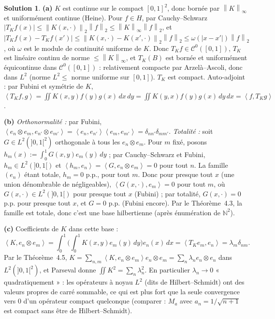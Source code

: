 \documentclass[11pt,a4paper]{article}
\newcommand{\N}{\mathbb{N}}
\newcommand{\norm}[1]{\left\|#1\right\|}
\newcommand{\ps}[2]{\left\langle #1,#2\right\rangle}
\newcommand{\Cz}{\mathcal{C}^0}
\theoremstyle{definition}
\newtheorem*{solution}{Solution}
\begin{document}
\begin{solution}
\noindent\textbf{(a)} $K$ est continue sur le compact $[0,1]^2$, donc bornée par $\norm K_\infty$ et uniformément continue (Heine). Pour $f\in H$, par Cauchy--Schwarz $|T_Kf(x)|\le\norm{K(x,\cdot)}_2\norm f_2\le\norm K_\infty\norm f_2$, et $|T_Kf(x)-T_Kf(x')|\le\norm{K(x,\cdot)-K(x',\cdot)}_2\norm f_2\le\omega(|x-x'|)\norm f_2$, où $\omega$ est le module de continuité uniforme de $K$. Donc $T_Kf\in\Cz([0,1])$, $T_K$ est linéaire continu de norme $\le\norm K_\infty$, et $T_K(B)$ est bornée et uniformément équicontinue dans $\Cz([0,1])$ : relativement compacte par Arzelà--Ascoli, donc dans $L^2$ (norme $L^2\le$ norme uniforme sur $[0,1]$). $T_K$ est compact. Auto-adjoint : par Fubini et symétrie de $K$, $\ps{T_Kf}g=\iint K(x,y)f(y)g(x)\,dx\,dy=\iint K(y,x)f(y)g(x)\,dy\,dx=\ps f{T_Kg}$.

\medskip
\noindent\textbf{(b)} \emph{Orthonormalité :} par Fubini, $\ps{e_n\otimes e_m}{e_{n'}\otimes e_{m'}}=\ps{e_n}{e_{n'}}\ps{e_m}{e_{m'}}=\delta_{nn'}\delta_{mm'}$. \emph{Totalité :} soit $G\in L^2(]0,1[^2)$ orthogonale à tous les $e_n\otimes e_m$. Pour $m$ fixé, posons $h_m(x):=\int_0^1G(x,y)e_m(y)\,dy$ ; par Cauchy--Schwarz et Fubini, $h_m\in L^2(]0,1[)$ et $\ps{h_m}{e_n}=\ps G{e_n\otimes e_m}=0$ pour tout $n$. La famille $(e_n)$ étant totale, $h_m=0$ p.p., pour tout $m$. Donc pour presque tout $x$ (une union dénombrable de négligeables), $\ps{G(x,\cdot)}{e_m}=0$ pour tout $m$, où $G(x,\cdot)\in L^2(]0,1[)$ pour presque tout $x$ (Fubini) ; par totalité, $G(x,\cdot)=0$ p.p. pour presque tout $x$, et $G=0$ p.p. (Fubini encore). Par le Théorème~4.3, la famille est totale, donc c'est une base hilbertienne (après énumération de $\N^2$).

\medskip
\noindent\textbf{(c)} Coefficients de $K$ dans cette base :
\[
\ps K{e_n\otimes e_m}=\int_0^1\Big(\int_0^1K(x,y)e_m(y)\,dy\Big)e_n(x)\,dx=\ps{T_Ke_m}{e_n}=\lambda_m\delta_{nm}.
\] Par le Théorème~4.5, $K=\sum_{n,m}\ps K{e_n\otimes e_m}e_n\otimes e_m=\sum_n\lambda_ne_n\otimes e_n$ dans $L^2(]0,1[^2)$, et Parseval donne $\iint K^2=\sum_n\lambda_n^2$. En particulier $\lambda_n\to0$ « quadratiquement » : les opérateurs à noyau $L^2$ (dits de Hilbert--Schmidt) ont des valeurs propres de carré sommable, ce qui est plus fort que la seule convergence vers $0$ d'un opérateur compact quelconque (comparer : $M_a$ avec $a_n=1/\sqrt{n+1}$ est compact sans être de Hilbert--Schmidt).


\end{solution}
\end{document}
